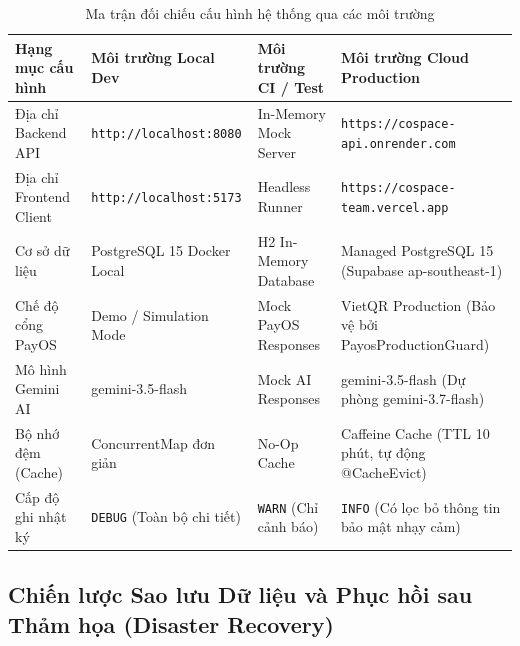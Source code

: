 \begin{table}[H]
\centering
\caption{Ma trận đối chiếu cấu hình hệ thống qua các môi trường}
\label{tab:environment-matrix}
\renewcommand{\arraystretch}{1.3}
\begin{tabular}{|p{3.5cm}|p{3.5cm}|p{3.5cm}|p{4cm}|}
\hline
\textbf{Hạng mục cấu hình} & \textbf{Môi trường Local Dev} & \textbf{Môi trường CI / Test} & \textbf{Môi trường Cloud Production} \\
\hline
Địa chỉ Backend API & \texttt{http://localhost:8080} & In-Memory Mock Server & \texttt{https://cospace-api.onrender.com} \\
\hline
Địa chỉ Frontend Client & \texttt{http://localhost:5173} & Headless Runner & \texttt{https://cospace-team.vercel.app} \\
\hline
Cơ sở dữ liệu & PostgreSQL 15 Docker Local & H2 In-Memory Database & Managed PostgreSQL 15 (Supabase ap-southeast-1) \\
\hline
Chế độ cổng PayOS & Demo / Simulation Mode & Mock PayOS Responses & VietQR Production (Bảo vệ bởi PayosProductionGuard) \\
\hline
Mô hình Gemini AI & gemini-3.5-flash & Mock AI Responses & gemini-3.5-flash (Dự phòng gemini-3.7-flash) \\
\hline
Bộ nhớ đệm (Cache) & ConcurrentMap đơn giản & No-Op Cache & Caffeine Cache (TTL 10 phút, tự động @CacheEvict) \\
\hline
Cấp độ ghi nhật ký & \texttt{DEBUG} (Toàn bộ chi tiết) & \texttt{WARN} (Chỉ cảnh báo) & \texttt{INFO} (Có lọc bỏ thông tin bảo mật nhạy cảm) \\
\hline
\end{tabular}
\end{table}

\subsection{Chiến lược Sao lưu Dữ liệu và Phục hồi sau Thảm họa (Disaster Recovery)}

